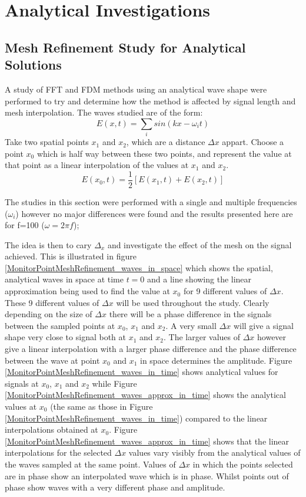 
\chapter{Analytical Investigations} %
\label{Chapter 4}

\section{Mesh Refinement Study for Analytical Solutions}
A study of FFT and FDM methods using an analytical wave shape were performed to try and determine how the method is affected by signal length and mesh interpolation. The waves studied are of the form:
$$
E(x,t) = \sum_i sin(kx - \omega_i t)
$$
Take two spatial points $x_1$ and $x_2$, which are a distance $\Delta x$ appart. Choose a point $x_0$ which is half way between these two points, and represent the value at that point as a linear interpolation of the values at $x_1$ and $x_2$.
$$
E(x_0,t) = \frac{1}{2} \left[ E(x_1,t) + E(x_2,t) \right]
$$

The studies in this section were performed with a single and multiple frequencies ($\omega_i$) however no major differences were found and the results presented here are for f=100 ($\omega = 2 \pi f$);

The idea is then to cary $\Delta_x$ and investigate the effect of the mesh on the signal achieved. This is illustrated in figure \ref{MonitorPointMeshRefinement_waves_in_space} which shows the spatial, analytical waves in space at time $t=0$ and a line showing the linear approximation being used to find the value at $x_0$ for 9 different values of $\Delta x$. These 9 different values of $\Delta x$ will be used throughout the study. Clearly depending on the size of $\Delta x$ there will be a phase difference in the signals between the sampled points at $x_0$, $x_1$ and $x_2$. A very small $\Delta x$ will give a signal shape very close to signal both at $x_1$ and $x_2$. The larger values of $\Delta x$ however give a linear interpolation with a larger phase difference and the phase difference between the wave at point $x_0$ and $x_1$ in space determines the amplitude. Figure \ref{MonitorPointMeshRefinement_waves_in_time} shows analytical values for signals at $x_0$, $x_1$ and $x_2$ while Figure \ref{MonitorPointMeshRefinement_waves_approx_in_time} shows the analytical values at $x_0$ (the same as those in Figure \ref{MonitorPointMeshRefinement_waves_in_time}) compared to the linear interpolations obtained at $x_0$. Figure \ref{MonitorPointMeshRefinement_waves_approx_in_time} shows that the linear interpolations for the selected $\Delta x$ values vary visibly from the analytical values of the waves sampled at the same point. Values of $\Delta x$ in which the points selected are in phase show an interpolated wave which is in phase. Whilst points out of phase show waves with a very different phase and amplitude.

